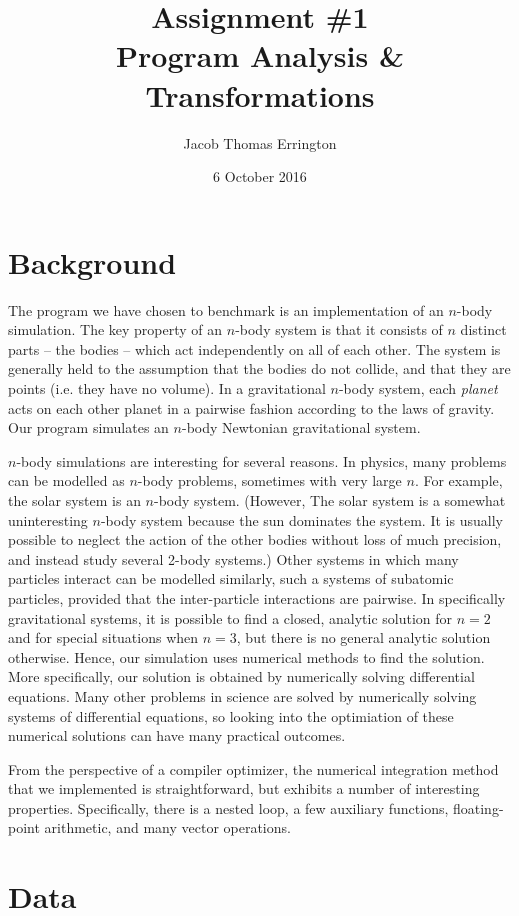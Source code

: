 \documentclass[11pt,letterpaper]{article}
\author{Jacob Thomas Errington}
\title{Assignment \#1\\Program Analysis \& Transformations}
\date{6 October 2016}
\begin{document}
\maketitle

\section{Background}

The program we have chosen to benchmark is an implementation of an $n$-body
simulation.  The key property of an $n$-body system is that it consists of $n$
distinct parts -- the bodies -- which act independently on all of each other.
The system is generally held to the assumption that the bodies do not collide,
and that they are points (i.e. they have no volume). In a gravitational
$n$-body system, each \emph{planet} acts on each other planet in a pairwise
fashion according to the laws of gravity. Our program simulates an $n$-body
Newtonian gravitational system.

$n$-body simulations are interesting for several reasons. In physics, many
problems can be modelled as $n$-body problems, sometimes with very large $n$.
For example, the solar system is an $n$-body system. (However, The solar system
is a somewhat uninteresting $n$-body system because the sun dominates the
system. It is usually possible to neglect the action of the other bodies
without loss of much precision, and instead study several 2-body systems.)
Other systems in which many particles interact can be modelled similarly, such
a systems of subatomic particles, provided that the inter-particle interactions
are pairwise. In specifically gravitational systems, it is possible to find a
closed, analytic solution for $n = 2$ and for special situations when $n = 3$,
but there is no general analytic solution otherwise. Hence, our simulation uses
numerical methods to find the solution. More specifically, our solution is
obtained by numerically solving differential equations. Many other problems in
science are solved by numerically solving systems of differential equations, so
looking into the optimiation of these numerical solutions can have many
practical outcomes.

From the perspective of a compiler optimizer, the numerical integration method
that we implemented is straightforward, but exhibits a number of interesting
properties. Specifically, there is a nested loop, a few auxiliary functions,
floating-point arithmetic, and many vector operations.

\section{Data}
\end{document}
